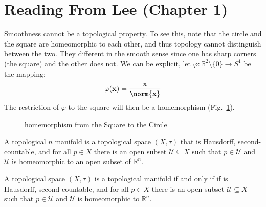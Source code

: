 \documentclass{article}                                                        %
\begin{document}
    \section{Reading From Lee (Chapter 1)}
        Smoothness cannot be a topological property. To see this, note that the
        circle and the square are homeomorphic to each other, and thus topology
        cannot distinguish between the two. They different in the smooth sense
        since one has sharp corners (the square) and the other does not. We can
        be explicit, let
        $\varphi:\mathbb{R}^{2}\setminus\{0\}\rightarrow{S}^{1}$ be the mapping:
        \begin{equation}
            \varphi(\mathbf{x})=\frac{\mathbf{x}}{\norm{\mathbf{x}}}
        \end{equation}
        The restriction of $\varphi$ to the square will then be a homemorphism
        (Fig.~\ref{fig:Homeomorphism_Square_to_Circle}).
        \begin{figure}[H]
            \centering
            \captionsetup{type=figure}
            
            \caption{homemorphism from the Square to the Circle}
            \label{fig:Homeomorphism_Square_to_Circle}
        \end{figure}
        \begin{definition}
            A topological $n$ manifold is a topological space $(X,\tau)$ that is
            Hausdorff, second-countable, and for all $p\in{X}$ there is an open
            subset $\mathcal{U}\subseteq{X}$ such that $p\in\mathcal{U}$ and
            $\mathcal{U}$ is homeomorphic to an open subset of $\mathbb{R}^{n}$.
        \end{definition}
        \begin{theorem}
            A topological space $(X,\tau)$ is a topological manifold if and only
            if if is Hausdorff, second countable, and for all $p\in{X}$ there is
            an open subset $\mathcal{U}\subseteq{X}$ such that $p\in\mathcal{U}$
            and $\mathcal{U}$ is homeomorphic to $\mathbb{R}^{n}$.
        \end{theorem}
\end{document}
